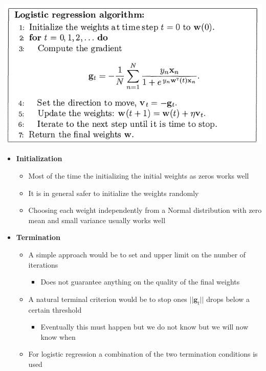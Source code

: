 \documentclass[11pt]{article}
\begin{document}
\begin{enumerate}
\begin{center}
\includegraphics[width=.9\linewidth]{The Linear Model/screenshot_2018-09-03_17-28-37.png}
\end{center}

\begin{itemize}
\item \textbf{Initialization}
\begin{itemize}
\item Most of the time the initializing the initial weights as zeros works well
\item It is in general safer to initialize the weights randomly
\item Choosing each weight independently from a Normal distribution with zero mean and small variance usually works well
\end{itemize}

\item \textbf{Termination}
\begin{itemize}
\item A simple approach would be to set and upper limit on the number of iterations
\begin{itemize}
\item Does not guarantee anything on the quality of the final weights
\end{itemize}
\item A natural terminal criterion would be to stop ones \(||\pmb g_t||\) drops below a certain threshold
\begin{itemize}
\item Eventually this must happen but we do not know but we will now know when
\end{itemize}
\item For logistic regression a combination of the two termination conditions is used
\end{itemize}
\end{itemize}


\end{enumerate}
\end{document}
